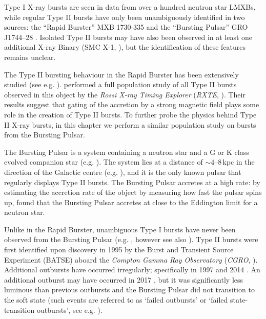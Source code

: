 \par Type I X-ray bursts are seen in data from over a hundred neutron star LMXBs, while regular Type II bursts have only been unambiguously identified in two sources: the ``Rapid Burster'' MXB 1730-335 \citep{Lewin_TypeII} and the ``Bursting Pulsar'' GRO J1744--28 \citep{Kouveliotou_BP}.   Isolated Type II bursts may have also been observed in at least one additional X-ray Binary (SMC X-1, \citealp{Angelini_SMC}), but the identification of these features remains unclear.
\par The Type II bursting behaviour in the Rapid Burster has been extensively studied (see e.g. \citealp{Lewin_TypeII,Hoffman_RB}).  \citet{Bagnoli_PopStudy} performed a full population study of all Type II bursts observed in this object by the \textit{Rossi X-ray Timing Explorer} (\textit{RXTE}, \citealp{Bradt_RXTE}).  Their results suggest that gating of the accretion by a strong magnetic field plays some role in the creation of Type II bursts.  To further probe the physics behind Type II X-ray bursts, in this chapter we perform a similar population study on bursts from the Bursting Pulsar.
\par The Bursting Pulsar \citep{Paciesas_BPDiscovery} is a system containing a neutron star and a G or K class evolved companion star (e.g. \citealp{Sturner_BPNature,Gosling_BPCompanion,Masetti_BPCompanion}).  The system lies at a distance of $\sim4$--$8$\,kpc in the direction of the Galactic centre (e.g. \citealp{Kouveliotou_BP,Gosling_BPCompanion,Sanna_BP}), and it is the only known pulsar that regularly displays Type II bursts.  The Bursting Pulsar accretes at a high rate: by estimating the accretion rate of the object by measuring how fast the pulsar spins up, \citealp{Sturner_BPNature} found that the Bursting Pulsar accretes at close to the Eddington limit for a neutron star.
\par Unlike in the Rapid Burster, unambiguous Type I bursts have never been observed from the Bursting Pulsar (e.g. \citealp{Giles_BP}, however see also \citealp{Lamb_TypeIBP,Doroshenko_NBFlash}).  Type II bursts were first identified upon discovery in 1995 by the Burst and Transient Source Experiment (BATSE) aboard the \textit{Compton Gamma Ray Observatory} (\textit{CGRO}, \citealp{Gehrels_CGRO}).  Additional outbursts have occurred irregularly; specifically in 1997 and 2014 \citep{Woods_OB2,Kennea_BPOutburst}.  An additional outburst may have occurred in 2017 \citep{Sanna_BPOutburst}, but it was significantly less luminous than previous outbursts and the Bursting Pulsar did not transition to the soft state (such events are referred to as `failed outbursts' or `failed state-transition outbursts', see e.g. \citealp{Sturner_Failed}).
